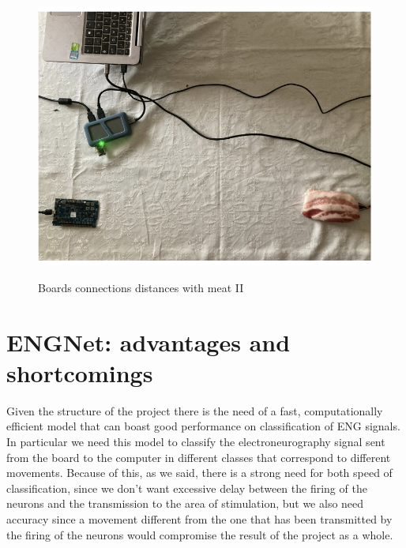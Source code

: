 \documentclass{Configuration_Files/PoliMi3i_thesis}
\begin{document}
\begin{figure}[H]
    \centering
    \includegraphics[scale=0.6]{Test_Procedure/23.png}
    \label{direct_communication_board_PC_23}
    \caption{Boards connections distances with meat II}
\end{figure}


\section{ENGNet: advantages and shortcomings}

Given the structure of the project there is the need of a fast, computationally efficient model that can boast good performance on classification of ENG signals.
In particular we need this model to classify the electroneurography signal sent from the board to the computer in different classes that correspond to different movements.
Because of this, as we said, there is a strong need for both speed of classification, since we don't want excessive delay between the firing of the neurons and the transmission to the area of stimulation, but we also need accuracy since a movement different from the one that has been transmitted by the firing of the neurons would compromise the result of the project as a whole.
\end{document}
